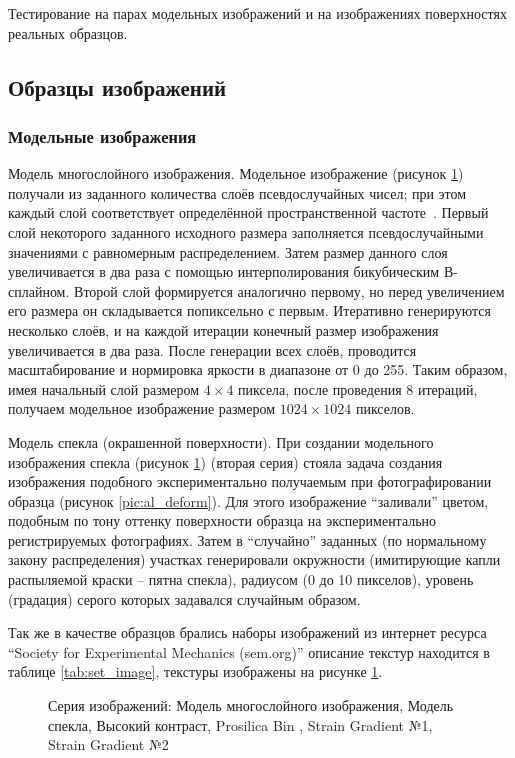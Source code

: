 Тестирование  на парах модельных изображений и на изображениях поверхностях реальных образцов.
\subsection{Образцы изображений}
\subsubsection{Модельные изображения}

Модель многослойного изображения.
Модельное изображение (рисунок \ref{pic:gray_mix}) получали из заданного количества слоёв псевдослучайных чисел; при этом каждый слой соответствует определённой пространственной частоте~\cite{pan_15}. Первый слой некоторого заданного исходного размера заполняется псевдослучайными значениями с равномерным распределением. Затем размер данного слоя увеличивается в два раза с помощью интерполирования бикубическим В-сплайном. Второй слой формируется аналогично первому, но перед увеличением его размера он складывается попиксельно с первым. Итеративно генерируются несколько слоёв, и на каждой итерации конечный размер изображения увеличивается в два раза. После генерации всех слоёв, проводится масштабирование и нормировка яркости в диапазоне от 0 до 255. Таким образом, имея начальный слой размером $4 \times 4$ пиксела, после проведения 8 итераций, получаем модельное изображение размером $1024 \times 1024$ пикселов.

Модель спекла (окрашенной поверхности). При создании модельного изображения спекла (рисунок \ref{pic:gray_mix}) (вторая серия) стояла задача создания изображения подобного экспериментально получаемым при фотографировании образца (рисунок \ref{pic:al_deform}). Для этого изображение ``заливали'' цветом, подобным по тону оттенку поверхности образца на экспериментально регистрируемых фотографиях. Затем в ``случайно'' заданных (по нормальному закону распределения) участках генерировали окружности (имитирующие капли распыляемой краски – пятна спекла), радиусом (0 до 10 пикселов), уровень (градация) серого которых задавался случайным образом.

Так же в качестве образцов брались наборы изображений из интернет ресурса ``Society for Experimental Mechanics (sem.org)'' описание текстур находится в таблице \ref{tab:set_image}, текстуры изображены на рисунке \ref{pic:gray_mix}.

\begin{figure}[h!]
\caption{Серия изображений: Модель многослойного изображения, Модель спекла, Высокий контраст, Prosilica Bin , Strain Gradient №1, Strain Gradient №2}
\label{pic:gray_mix}
\end{figure}

